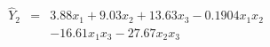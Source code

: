 

\[
\begin{array}{lll} \hat{Y}_{2} & = & 3.88x_1 + 9.03x_2 + 13.63x_3 - 0.1904x_{1}x_{2} \\ & &  - 16.61x_{1}x_{3} - 27.67x_{2}x_{3} \end{array}
\]


